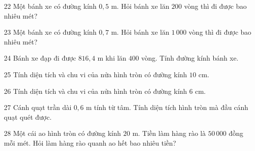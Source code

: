 \gap
\begin{probbox}{22}{\relax}
Một bánh xe có đường kính $0{,}5$ m. Hỏi bánh xe lăn $200$ vòng thì đi được bao nhiêu mét?
\end{probbox}
\gap
\begin{probbox}{23}{\relax}
Một bánh xe có đường kính $0{,}7$ m. Hỏi bánh xe lăn $1\,000$ vòng thì đi được bao nhiêu mét?
\end{probbox}
\gap
\begin{probbox}{24}{\relax}
Bánh xe đạp đi được $816{,}4$ m khi lăn $400$ vòng. Tính đường kính bánh xe.
\end{probbox}
\gap
\begin{probbox}{25}{\relax}
Tính diện tích và chu vi của nửa hình tròn có đường kính $10$ cm.
\end{probbox}
\gap
\begin{probbox}{26}{\relax}
Tính diện tích và chu vi của nửa hình tròn có đường kính $6$ cm.
\end{probbox}
\gap
\begin{probbox}{27}{\relax}
Cánh quạt trần dài $0{,}6$ m tính từ tâm. Tính diện tích hình tròn mà đầu cánh quạt quét được.
\end{probbox}
\gap
\begin{probbox}{28}{\relax}
Một cái ao hình tròn có đường kính $20$ m. Tiền làm hàng rào là $50\,000$ đồng mỗi mét. Hỏi làm hàng rào quanh ao hết bao nhiêu tiền?
\end{probbox}
